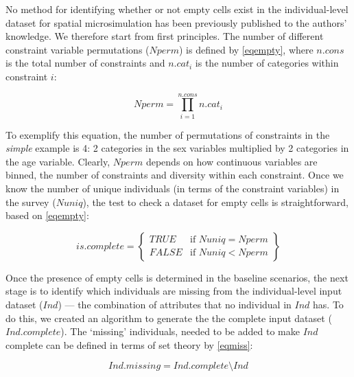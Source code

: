 \documentclass[a4paper,10pt]{article}
\begin{document}
No method for identifying whether or not empty cells exist in the
individual-level dataset for spatial microsimulation has been previously published
to the authors' knowledge. We therefore start from first principles.
The number of different constraint variable permutations ($Nperm$) is defined by \cref{eqempty},
where $n.cons$ is the total number of constraints and $n.cat_i$ is the number of categories
within constraint $i$:

\begin{equation}
\displaystyle Nperm = \prod_{i = 1}^{n.cons} n.cat_{i} 
\label{eqempty}
\end{equation}

To exemplify this equation, the number of permutations of constraints in the
\emph{simple} example is 4: 2 categories in the sex variables multiplied by
2 categories in the age variable. Clearly, $Nperm$ depends on how continuous variables
are binned, the number of constraints and diversity within each constraint.
Once we know the number of unique individuals (in terms of the constraint variables)
in the survey ($Nuniq$), the test to check a dataset for empty cells is straightforward,
based on \cref{eqempty}:

\begin{equation}
is.complete =
\left\{
	\begin{array}{ll}
		TRUE  & \mbox{if } Nuniq = Nperm \\
		FALSE & \mbox{if } Nuniq < Nperm
	\end{array}
\right\}
\end{equation}


Once the presence of empty cells is determined in the baseline scenarios, the next 
stage is to identify which individuals are missing from the individual-level input
dataset ($Ind$) --- the combination of attributes that no individual in $Ind$ has.
To do this, we created an algorithm to generate the the complete input dataset ($Ind.complete$).
The `missing' individuals, needed to be added to make $Ind$ complete can be defined
in terms of set theory by \cref{eqmiss}:

\begin{equation}
 Ind.missing = Ind.complete\setminus Ind
\label{eqmiss}
\end{equation}
\end{document}
